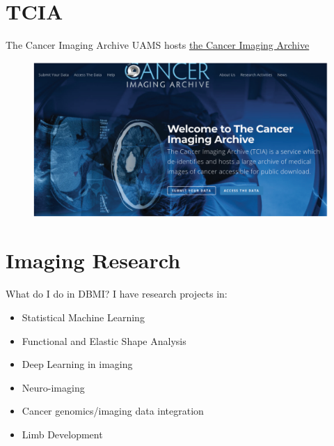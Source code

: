 \documentclass[11pt, aspectratio=43]{beamer}
\begin{document}
\section{TCIA}	

\begin{frame}{The Cancer Imaging Archive}
	UAMS hosts \hyperlink{https://www.cancerimagingarchive.net/}{the Cancer Imaging Archive}
	\begin{figure}[h]
		\centering
		\includegraphics[scale=0.45]{Figures/TCIA.png}
	\end{figure}
	
\end{frame}


\section{Imaging Research}
	

	
	\begin{frame}{What do I do in DBMI?}
		I have research projects in:
		\begin{itemize}
			\item Statistical Machine Learning
			\item Functional and Elastic Shape Analysis
			\item Deep Learning in imaging
			\item Neuro-imaging			
			\item Cancer genomics/imaging data integration
			\item Limb Development
		\end{itemize}
		
	\end{frame}
\end{document}
